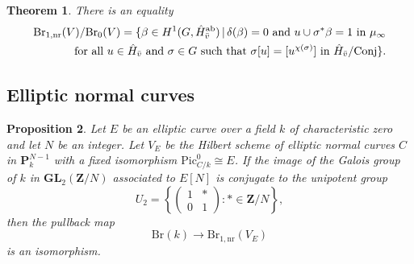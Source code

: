 \documentclass[10pt,letterpaper,twoside]{article}
\renewcommand{\1}{\mathbf{1}}
\newcommand{\bP}{\mathbf{P}}
\newcommand{\bZ}{\mathbf{Z}}
\newcommand{\nr}{\mathrm{nr}}
\newcommand{\GL}{\mathbf{GL}}
\newcommand{\Pic}{\mathrm{Pic}}
\newcommand{\Br}{\mathrm{Br}}
\newcommand{\iso}{\cong}
\theoremstyle{plain}
\newtheorem{theorem}{Theorem}[section]
\newtheorem{proposition}[theorem]{Proposition}
\theoremstyle{plain}
\theoremstyle{definition}
\theoremstyle{named}
\theoremstyle{definition}
\begin{document}
\begin{theorem}
    There is an equality
    \begin{align*}
        \Br_{1,\nr}(V)/\Br_0(V) = \{\beta \in H^1(G, \hat{H}^{\mathrm{ab}}_{\Bar{v}}) \,|\, \delta(\beta) = 0 \text{ and } u \cup \sigma^*\beta = 1 \text{ in $\mu_\infty$}\\
        \text{for all $u \in \hat{H}_{\Bar{v}}$ and $\sigma \in G$ such that $\sigma[u] = [u^{\chi(\sigma)}]$ in $\hat{H}_{\Bar{v}}/\text{Conj}$}\}.
    \end{align*}
\end{theorem}




\subsection{Elliptic normal curves}



\begin{proposition}
    Let $E$ be an elliptic curve over a field $k$ of characteristic zero and let $N$ be an integer. Let $V_E$ be the
    Hilbert scheme of elliptic normal curves $C$ in $\bP^{N-1}_k$
    with a fixed isomorphism $\Pic_{C/k}^0\iso E$. 
    If the image of the Galois group of $k$ in $\GL_2(\bZ/N)$ associated to $E[N]$
    is conjugate to the unipotent group $$U_2=\left\{\begin{pmatrix}1&*\\0&1\end{pmatrix}\colon
    *\in\bZ/N\right\},$$ then the pullback map $$\Br(k)\rightarrow\Br_{1,\nr}(V_E)$$
    is an isomorphism.
\end{proposition}
\end{document}
